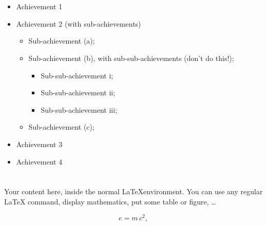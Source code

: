 \documentclass[11pt, a4paper, sans]{moderncv}
\begin{document}
\section{%
}\closesection

\begin{itemize}
\item Achievement 1
\item Achievement 2 (with sub-achievements)
  \begin{itemize}
  \item Sub-achievement (a);
  \item Sub-achievement (b), with sub-sub-achievements (don't do this!);
    \begin{itemize}
    \item Sub-sub-achievement i;
    \item Sub-sub-achievement ii;
    \item Sub-sub-achievement iii;
    \end{itemize}
  \item Sub-achievement (c);
  \end{itemize}
\item Achievement 3
\item Achievement 4
\end{itemize}

\section{%
}\closesection

Your content here, inside the normal \LaTeX environment. You can use any regular \LaTeX{} command, display mathematics, put some table or figure, \dots

\[e =m\,c^2,\] 

\emptysection{}

\rfoot{\small\textcolor{gray}{v\yyyymmdate\today}}
\end{document}
